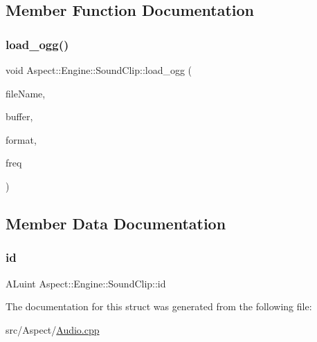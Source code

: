\subsection{Member Function Documentation}
\mbox{\label{struct_aspect_1_1_engine_1_1_sound_clip_afe23f1aea045236c4ced62ff144e3fbe}} 
\subsubsection{\texorpdfstring{load\+\_\+ogg()}{load\_ogg()}}
{\footnotesize\ttfamily void Aspect\+::\+Engine\+::\+Sound\+Clip\+::load\+\_\+ogg (\begin{DoxyParamCaption}\item[{std\+::string}]{file\+Name,  }\item[{std\+::vector$<$ char $>$ \&}]{buffer,  }\item[{A\+Lenum \&}]{format,  }\item[{A\+Lsizei \&}]{freq }\end{DoxyParamCaption})\hspace{0.3cm}{\ttfamily [inline]}}



\subsection{Member Data Documentation}
\mbox{\label{struct_aspect_1_1_engine_1_1_sound_clip_a4f13ca26dcad6392765f5c170cf1031d}} 
\subsubsection{\texorpdfstring{id}{id}}
{\footnotesize\ttfamily A\+Luint Aspect\+::\+Engine\+::\+Sound\+Clip\+::id}



The documentation for this struct was generated from the following file\+:\begin{DoxyCompactItemize}
\item 
src/\+Aspect/\mbox{\hyperlink{_audio_8cpp}{Audio.\+cpp}}\end{DoxyCompactItemize}
